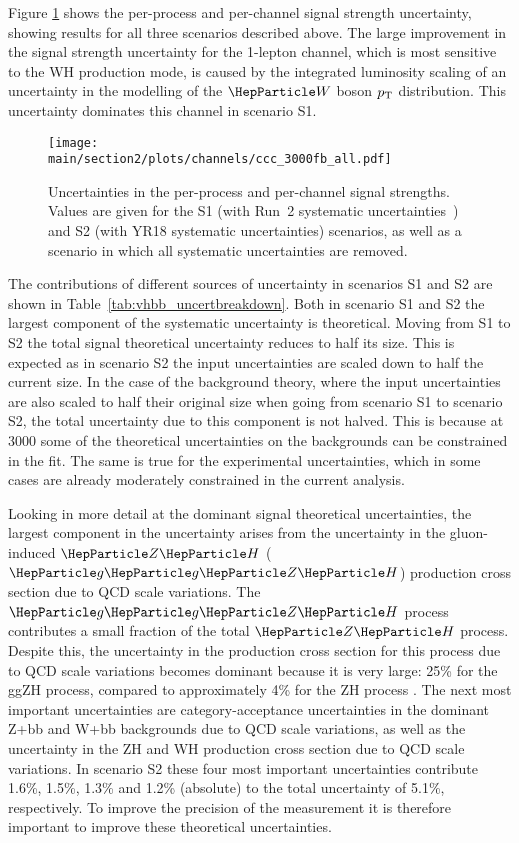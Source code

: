 Figure \ref{fig:vhbb_proj_bars} shows the per-process and
per-channel signal strength uncertainty, showing results for all three scenarios described above.
The large improvement in the signal strength uncertainty for the 1-lepton channel, which is most sensitive to the WH production
mode, is caused by the integrated luminosity scaling of an uncertainty in the modelling of the $\PW$ boson $p\sb{\scriptstyle\mathrm{T}}$ distribution. This uncertainty dominates this channel
in scenario S1.

\begin{figure}[h!]
\begin{center}
\texttt{[image: \\main/section2/plots/channels/ccc\_3000fb\_all.pdf]}
\end{center}
\caption{Uncertainties in the per-process and per-channel signal strengths. Values are given for the S1 (with Run~2 systematic uncertainties~\cite{HIG16044}) and S2 (with YR18 systematic uncertainties) scenarios, as well as a scenario in which all systematic uncertainties are removed.}
\label{fig:vhbb_proj_bars}
\end{figure}

The contributions of different sources of uncertainty in scenarios S1 and S2 are shown in Table~\ref{tab:vhbb_uncertbreakdown}.
Both in scenario S1 and S2 the largest component of the systematic uncertainty is theoretical. Moving from S1 to S2 the total signal theoretical uncertainty reduces to half its size. This is expected as in scenario S2 the input uncertainties
are scaled down to half the current size. In the case of the background theory, where the input uncertainties are also scaled to half their original
size when going from scenario S1 to scenario S2, the total uncertainty due to this component is not halved. This is because at 3000 \fbinv
some of the theoretical uncertainties on the backgrounds can be constrained in the fit. The same is true for the experimental uncertainties, which
in some cases are already moderately constrained in the current analysis.

Looking in more detail at the dominant signal theoretical uncertainties, the largest component in the uncertainty arises from the uncertainty in the gluon-induced $\zh$ ($\ggZH$) production cross section due to QCD scale variations.
The $\ggZH$ process contributes a small fraction of the total $\zh$ process. Despite this, the uncertainty in the production cross section for this process due to QCD scale variations 
becomes dominant because it is very large: 25\% for the ggZH process, compared to approximately 4\% for the ZH process \cite{deFlorian:2016spz}.
The next most important uncertainties are category-acceptance uncertainties in the dominant Z+bb and W+bb backgrounds due to QCD scale variations, as well as the uncertainty in the ZH and WH production
cross section due to QCD scale variations. In scenario S2 these four most important uncertainties contribute 1.6\%, 1.5\%, 1.3\% and 1.2\% (absolute) to
the total uncertainty of 5.1\%, respectively. To improve the precision of the measurement it is therefore important to improve these theoretical uncertainties.

